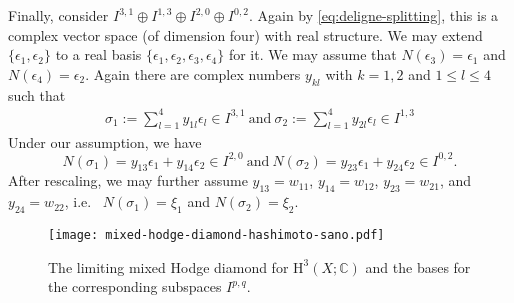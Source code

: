 Finally, consider \(I^{3,1}\oplus I^{1,3}\oplus I^{2,0}\oplus I^{0,2}\).
Again by \eqref{eq:deligne-splitting}, this is a complex vector space
(of dimension four) with real structure. We may extend 
\(\{\epsilon_{1},\epsilon_{2}\}\) to a real basis 
\(\{\epsilon_{1},\epsilon_{2},\epsilon_{3},\epsilon_{4}\}\) for it.
We may assume that \(N(\epsilon_{3})=\epsilon_{1}\) and
\(N(\epsilon_{4})=\epsilon_{2}\).
Again there are complex numbers \(y_{kl}\)
with \(k=1,2\) and \(1\le l\le 4\) such that
\begin{align*}
\sigma_{1}:=\sum_{l=1}^{4}y_{1l}\epsilon_{l}\in I^{3,1}~\mbox{and}~
\sigma_{2}:=\sum_{l=1}^{4}y_{2l}\epsilon_{l}\in I^{1,3}
\end{align*}
Under our assumption, we have
\begin{equation}
N(\sigma_{1})=y_{13}\epsilon_{1}+y_{14}\epsilon_{2}\in I^{2,0}~\mbox{and}~
N(\sigma_{2})=y_{23}\epsilon_{1}+y_{24}\epsilon_{2}\in I^{0,2}.
\end{equation}
After rescaling, we may further assume \(y_{13}=w_{11}\), \(y_{14}=w_{12}\),
\(y_{23}=w_{21}\), and \(y_{24}=w_{22}\), i.e.~
\(N(\sigma_{1})=\xi_{1}\) and \(N(\sigma_{2})=\xi_{2}\).

\begin{figure}
\texttt{[image: mixed-hodge-diamond-hashimoto-sano.pdf]}
\caption{The limiting mixed Hodge diamond for 
\(\mathrm{H}^{3}(X;\mathbb{C})\) and the bases for
the corresponding subspaces \(I^{p,q}\).}
\end{figure}

